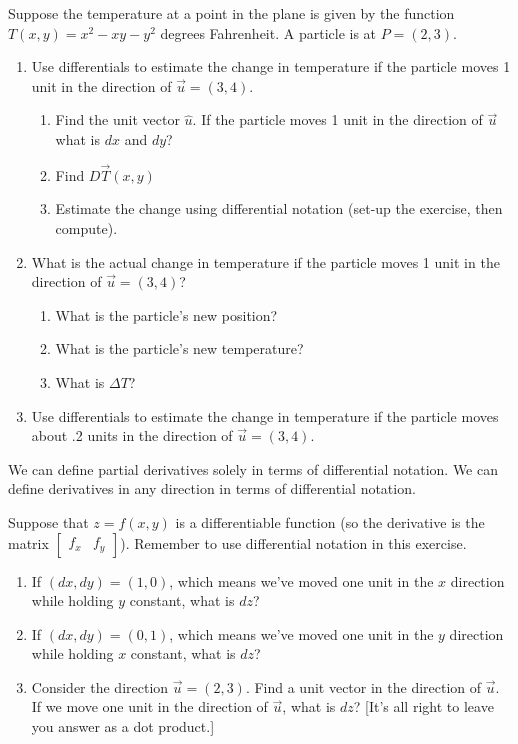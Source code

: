 \begin{problem}
Suppose the temperature at a point in the plane is given by the function {$T(x,y)=x^2-xy-y^2$} degrees Fahrenheit. A particle is at $P=(2,3)$.  
\begin{enumerate}
 \item Use differentials to estimate the change in temperature if the particle moves 1 unit in the direction of $\vec u=\left(3,4\right)$.
\begin{enumerate}[label=\alph*]
\item Find the unit vector $\hat{u}$. If the particle moves 1 unit in the direction of $\vec{u}$ what is $dx$ and $dy$?
\item Find $D\vec{T}(x,y)$
\item Estimate the change using differential notation (set-up the exercise, then compute).
\end{enumerate}
 \item What is the actual change in temperature if the particle moves 1 unit in the direction of $\vec u=\left(3,4\right)$?
\begin{enumerate}[label=\alph*]
\item What is the particle's new position?
\item What is the particle's new temperature?
\item What is $\Delta T$?
\end{enumerate}
 \item Use differentials to estimate the change in temperature if the particle moves about .2 units in the direction of $\vec u=\left(3,4\right)$. 
\end{enumerate}
\end{problem}

We can define partial derivatives solely in terms of differential notation. We can define derivatives in any direction in terms of differential notation.

\begin{problem}
Suppose that $z=f(x,y)$ is a differentiable function (so the derivative is the matrix $\begin{bmatrix}f_x&f_y\end{bmatrix}$).  Remember to use differential notation in this exercise.
\begin{enumerate}
 \item If $(dx,dy)=(1,0)$, which means we've moved one unit in the $x$ direction while holding $y$ constant, what is $dz$?
 \item If $(dx,dy)=(0,1)$, which means we've moved one unit in the $y$ direction while holding $x$ constant, what is $dz$?
 \item Consider the direction $\vec u=(2,3)$.  Find a unit vector in the direction of $\vec u$.  If we move one unit in the direction of $\vec u$, what is $dz$? [It's all right to leave you answer as a dot product.]    
\end{enumerate}
 
\end{problem}

